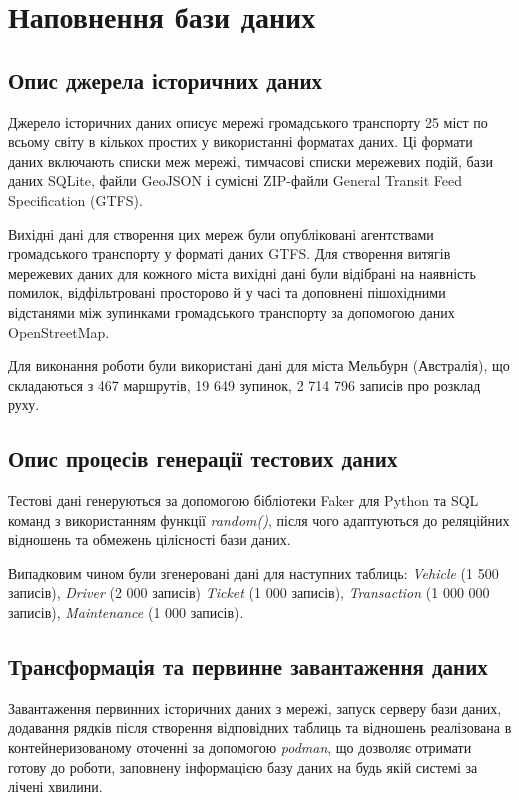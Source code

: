 \documentclass[oneside,14pt]{extarticle}
\begin{document}
\section{Наповнення бази даних}
\subsection{Опис джерела історичних даних}
Джерело історичних даних описує мережі громадського транспорту 25 міст по всьому світу в кількох простих у використанні форматах даних. Ці формати даних включають списки меж мережі, тимчасові списки мережевих подій, бази даних SQLite, файли GeoJSON і сумісні ZIP-файли General Transit Feed Specification (GTFS).

Вихідні дані для створення цих мереж були опубліковані агентствами громадського транспорту у форматі даних GTFS. Для створення витягів мережевих даних для кожного міста вихідні дані були відібрані на наявність помилок, відфільтровані просторово й у часі та доповнені пішохідними відстанями між зупинками громадського транспорту за допомогою даних OpenStreetMap.

Для виконання роботи були використані дані для міста Мельбурн (Австралія), що складаються з 467 маршрутів, 19 649 зупинок, 2 714 796 записів про розклад руху.

\subsection{Опис процесів генерації тестових даних}
Тестові дані генеруються за допомогою бібліотеки Faker для Python та SQL команд з використанням функції \textit{random()}, після чого адаптуються до реляційних відношень та обмежень цілісності бази даних. 

Випадковим чином були згенеровані дані для наступних таблиць: \textit{Vehicle} (1 500 записів), \textit{Driver} (2 000 записів) \textit{Ticket} (1 000 записів), \textit{Transaction} (1 000 000 записів), \textit{Maintenance} (1 000 записів).

\subsection{Трансформація та первинне завантаження даних}
Завантаження первинних історичних даних з мережі, запуск серверу бази даних, додавання рядків після створення відповідних таблиць та відношень реалізована в контейнеризованому оточенні за допомогою \textit{podman}, що дозволяє отримати готову до роботи, заповнену інформацією базу даних на будь якій системі за лічені хвилини.
\end{document}
